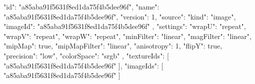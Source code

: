 {
  "id": "a85aba91f5631f8ed1da75f4b5dee96f",
  "name": "a85aba91f5631f8ed1da75f4b5dee96f",
  "version": 1,
  "source": {
    "kind": "image",
    "imageId": "a85aba91f5631f8ed1da75f4b5dee96f"
  },
  "settings": {
    "wrapU": "repeat",
    "wrapV": "repeat",
    "wrapW": "repeat",
    "minFilter": "linear",
    "magFilter": "linear",
    "mipMap": true,
    "mipMapFilter": "linear",
    "anisotropy": 1,
    "flipY": true,
    "precision": "low",
    "colorSpace": "srgb"
  },
  "textureIds": [
    "a85aba91f5631f8ed1da75f4b5dee96f"
  ],
  "imageIds": [
    "a85aba91f5631f8ed1da75f4b5dee96f"
  ]
}
